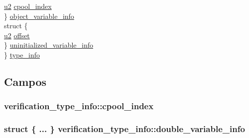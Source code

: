\begin{DoxyCompactItemize}
\begin{tabbing}
\>\>\hyperlink{lista__operandos_8h_a732cde1300aafb73b0ea6c2558a7a54f}{u2} \hyperlink{structverification__type__info_a5be06fb276eacd06d97febe64d7be884}{cpool\_index}\\
\>\} \hyperlink{structverification__type__info_a8cc9c3b34278efa436261995cd97a326}{object\_variable\_info}\\
\>struct \{\\
\>\>\hyperlink{lista__operandos_8h_a732cde1300aafb73b0ea6c2558a7a54f}{u2} \hyperlink{structverification__type__info_a697499159761ac261e39a9f7aabfb27d}{offset}\\
\>\} \hyperlink{structverification__type__info_a732c79b23b52ddb0f77b5e25360d5253}{uninitialized\_variable\_info}\\
\} \hyperlink{structverification__type__info_a694db81e19f00bd3af2cfa2fca4c81d2}{type\_info}\\

\end{tabbing}\end{DoxyCompactItemize}


\subsection{Campos}
\subsubsection[{\texorpdfstring{cpool\+\_\+index}{cpool_index}}]{ verification\+\_\+type\+\_\+info\+::cpool\+\_\+index}\hypertarget{structverification__type__info_a5be06fb276eacd06d97febe64d7be884}{}\label{structverification__type__info_a5be06fb276eacd06d97febe64d7be884}
\subsubsection[{\texorpdfstring{double\+\_\+variable\+\_\+info}{double_variable_info}}]{\setlength{\rightskip}{0pt plus 5cm}struct \{ ... \}   verification\+\_\+type\+\_\+info\+::double\+\_\+variable\+\_\+info}\hypertarget{structverification__type__info_a0198e2c34f8ffc66cbfe8adf0ab20170}{}\label{structverification__type__info_a0198e2c34f8ffc66cbfe8adf0ab20170}
